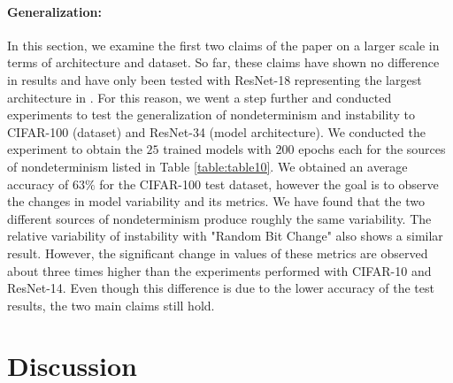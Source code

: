 \paragraph{Generalization:}
In this section, we examine the first two claims of the paper on a larger scale in terms of architecture and dataset. So far, these claims have shown no difference in results and have only been tested with ResNet-18 representing the largest architecture in \cite{summers2021nondeterminism}. For this reason, we went a step further and conducted experiments to test the generalization of nondeterminism and instability to CIFAR-100 (dataset) and ResNet-34 (model architecture). We conducted the experiment to obtain the $25$ trained models with $200$ epochs each for the sources of nondeterminism listed in Table \ref{table:table10}. We obtained an average accuracy of $63\%$ for the CIFAR-100 test dataset, however the goal is to observe the changes in model variability and its metrics.  We have found that the two different sources of nondeterminism produce roughly the same variability. The relative variability of instability with "Random Bit Change" also shows a similar result. However, the significant change in values of these metrics are observed about three times higher than the experiments performed with CIFAR-10 and ResNet-14. Even though this difference is due to the lower accuracy of the test results, the two main claims still hold.

\begin{table}[!htb]
\centering
{}
	\caption{Generalization of nondeterminism and instability}
	\label{table:table10}
\end{table}
\section{Discussion}
\label{sec:Discussion}

